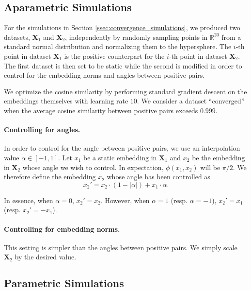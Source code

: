 \subsection{Aparametric Simulations}

For the simulations in Section \ref{ssec:convergence_simulations}, we produced two datasets, $\mathbf{X}_1$ and $\mathbf{X}_2$, independently by randomly sampling points in $\mathbb{R}^20$ from a standard normal distribution and normalizing them to the hypersphere. The $i$-th point in dataset $\mathbf{X}_1$ is the positive counterpart for the $i$-th point in dataset $\mathbf{X}_2$. The first dataset is then set to be static while the second is modified in order to control for the embedding norms and angles between positive pairs.

We optimize the cosine similarity by performing standard gradient descent on the embeddings themselves with learning rate $10$. We consider a dataset ``converged'' when the average cosine similarity between positive pairs exceeds $0.999$.

\paragraph{Controlling for angles.} In order to control for the angle between positive pairs, we use an interpolation value $\alpha \in [-1, 1]$. Let $x_1$ be a static embedding in $\mathbf{X}_1$ and $x_2$ be the embedding in $\mathbf{X}_2$ whose angle we wish to control. In expectation, $\phi(x_1, x_2)$ will be $\pi / 2$. We therefore define the embedding $x_2$ whose angle has been controlled as 
\[ x_2' = x_2 \cdot (1 - |\alpha|) + x_1 \cdot \alpha. \]

In essence, when $\alpha=0$, $x_2' = x_2$. However, when $\alpha=1$ (resp. $\alpha=-1$), $x_2' = x_1$ (resp. $x_2' = -x_1$).

\paragraph{Controlling for embedding norms.} This setting is simpler than the angles between positive pairs. We simply scale $\mathbf{X}_2$ by the desired value.

\subsection{Parametric Simulations}
\label{app:parametric_sim}

